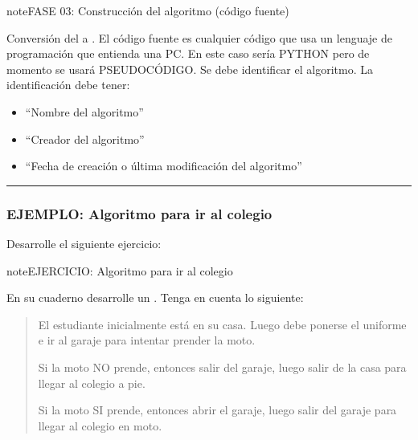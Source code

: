 \documentclass[letterpaper,10pt,spanish]{sphinxmanual}
\begin{document}
\begin{sphinxadmonition}{note}{FASE 03: Construcción del algoritmo (código fuente)}

\sphinxAtStartPar
Conversión del  a .
El código fuente es cualquier código que usa un lenguaje de programación que entienda una PC.
En este caso sería PYTHON pero de momento se usará PSEUDOCÓDIGO.
Se debe identificar el algoritmo. La identificación debe tener:
\begin{itemize}
\item {} 
\sphinxAtStartPar
{} “Nombre del algoritmo”

\item {} 
\sphinxAtStartPar
{} “Creador del algoritmo”

\item {} 
\sphinxAtStartPar
{} “Fecha de creación o última modificación del algoritmo”

\end{itemize}
\end{sphinxadmonition}


\bigskip\hrule\bigskip



\subsubsection{EJEMPLO: Algoritmo para ir al colegio}
\label{\detokenize{1_guias/10programacion/G1023:ejemplo-algoritmo-para-ir-al-colegio}}
\sphinxAtStartPar
Desarrolle el siguiente ejercicio:

\begin{sphinxadmonition}{note}{EJERCICIO: Algoritmo para ir al colegio}

\sphinxAtStartPar
En su cuaderno desarrolle un . Tenga en cuenta lo siguiente:
\begin{quote}

\sphinxAtStartPar
El estudiante inicialmente está en su casa. Luego debe ponerse el uniforme e ir al garaje para intentar prender la moto.

\sphinxAtStartPar
Si la moto NO prende, entonces salir del garaje, luego salir de la casa para llegar al colegio a pie.

\sphinxAtStartPar
Si la moto SI prende, entonces abrir el garaje, luego salir del garaje para llegar al colegio en moto.
\end{quote}
\end{sphinxadmonition}
\end{document}
